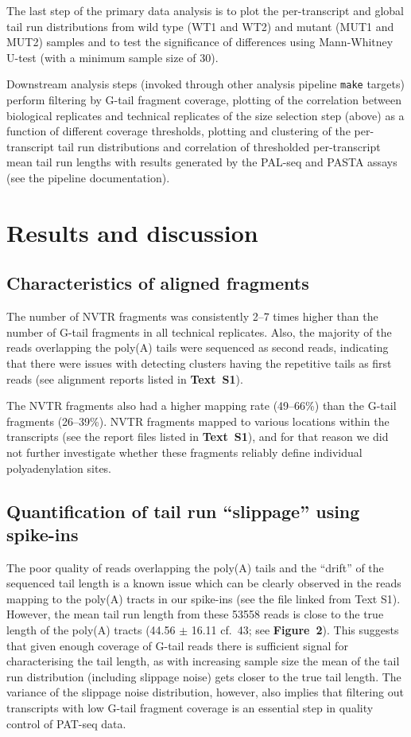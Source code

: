 \documentclass[10pt]{article}
\begin{document}
The last step of the primary data analysis is to plot the per-transcript and global tail run distributions from wild type (WT1 and WT2) and mutant (MUT1 and MUT2) samples and to test the significance of differences using Mann-Whitney U-test (with a minimum sample size of 30).

Downstream analysis steps (invoked through other analysis pipeline \texttt{make} targets) perform filtering by G-tail fragment coverage, plotting of the correlation between biological replicates and technical replicates of the size selection step (above) as a function of different coverage thresholds, plotting and clustering of the per-transcript tail run distributions and correlation of thresholded per-transcript mean tail run lengths with results generated by the PAL-seq \cite{subtelny14} and PASTA \cite{beilharz07} assays (see the pipeline documentation).

\section*{Results and discussion}

\subsection*{Characteristics of aligned fragments}

The number of NVTR fragments was consistently 2--7 times higher than the number of G-tail fragments in all technical replicates. Also, the majority of the reads overlapping the poly(A) tails were sequenced as second reads, indicating that there were issues with detecting clusters having the repetitive tails as first reads (see alignment reports listed in \textbf{Text~S1}).

The NVTR fragments also had a higher mapping rate (49--66\%) than the G-tail fragments (26--39\%).  NVTR fragments mapped to various locations within the transcripts (see the report files listed in \textbf{Text~S1}), and for that reason we did not further investigate whether these fragments reliably define individual polyadenylation sites.

\subsection*{Quantification of tail run ``slippage'' using spike-ins}

The poor quality of reads overlapping the poly(A) tails and the ``drift'' of the sequenced tail length is a known issue \cite{wilkening13} which can be clearly observed in the reads mapping to the poly(A) tracts in our spike-ins (see the file linked from Text S1). 
However, the mean tail run length from these 53558 reads is close to the true length of the poly(A) tracts (44.56 $\pm$ 16.11 cf.\ 43; see \textbf{Figure~2}). This suggests that given enough coverage of G-tail reads there is sufficient signal for characterising the tail length, as with increasing sample size the mean of the tail run distribution (including slippage noise) gets closer to the true tail length. The variance of the slippage noise distribution, however, also implies that filtering out transcripts with low G-tail fragment coverage is an essential step in quality control of PAT-seq data.
\end{document}
